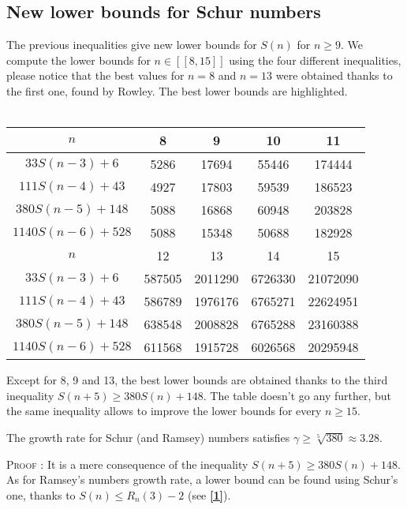 \subsection{New lower bounds for Schur numbers}

The previous inequalities give new lower bounds for \(S(n)\) for
\( n \geqslant 9 \). We compute the lower
bounds for \( n \in [\![8,15]\!] \) using the four different inequalities, please notice that the best values for \( n = 8\) and \(n = 13\) were obtained thanks to the first one, found by Rowley. The best lower bounds are highlighted.\\
\\
\begin{center}
\begin{tabular}{|*{5}{c|}}
    \hline
	\(n\) & 8 & 9 & 10 & 11 \\
	\hline
	\(33S(n-3) + 6 \) & \cellcolor{yellow} 5286 & 17694 & 55446 & 174444\\
	\hline
	\(111S(n-4) + 43 \) & 4927 & \cellcolor{yellow} 17803 & 59539 & 186523\\
	\hline
	\(380S(n-5) + 148 \) & 5088 & 16868 & \cellcolor{yellow} 60948 & \cellcolor{yellow} 203828 \\
	\hline
	\(1140S(n-6) + 528 \) & 5088 & 15348 & 50688 & 182928\\
	\hline
	\hline
	\(n\) & 12 & 13 & 14 & 15 \\
	\hline
	\(33S(n-3) + 6 \) & 587505 & \cellcolor{yellow} 2011290 & 6726330 & 21072090\\
	\hline
	\(111S(n-4) + 43 \) & 586789 & 1976176 & 6765271 & 22624951 \\
	\hline
	\(380S(n-5) + 148 \) & \cellcolor{yellow} 638548 & 2008828 & \cellcolor{yellow} 6765288 & \cellcolor{yellow} 23160388 \\
	\hline
	\(1140S(n-6) + 528 \) & 611568 & 1915728 & 6026568 & 20295948 \\
	\hline
\end{tabular}
\end{center}
Except for 8, 9 and 13, the best lower bounds are obtained thanks to
the third inequality \( S(n+5) \geqslant 380S(n) + 148\). The table
doesn't go any further, but the same inequality allows to improve the
lower bounds for every \( n \geqslant 15 \). 

\begin{corollary}
The growth rate for Schur (and Ramsey) numbers satisfies \(\gamma \geqslant \sqrt[5]{380} \approx 3.28 \).
\end{corollary}
\textsc{Proof :} It is a mere consequence of the inequality \( S(n+5) \geqslant 380S(n) + 148\). As for Ramsey's 
numbers growth rate, a lower bound can be found using Schur's one, thanks to \(S(n) \leqslant R_n(3)-2 \) 
(see \hyperlink{label1}{\textbf{[1]}}).
